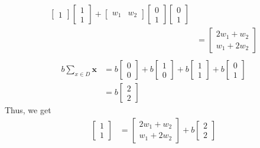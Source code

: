 \begin{align}
\begin{bmatrix}
    1
  \end{bmatrix} \begin{bmatrix}
    1 \\
    1
  \end{bmatrix} + \begin{bmatrix}
    w_1 & w_2
  \end{bmatrix} \begin{bmatrix}
    0 \\
    1
  \end{bmatrix} \begin{bmatrix}
    0 \\
    1
  \end{bmatrix} \\
  &= \begin{bmatrix}
    2w_1 + w_2 \\
    w_1 + 2w_2
  \end{bmatrix} \\
  \nonumber
\end{align}
\begin{align}
  b\sum_{x\in D}\textbf{x} &= 
    b\begin{bmatrix}
      0 \\
      0
    \end{bmatrix} + b\begin{bmatrix}
      1 \\
      0
    \end{bmatrix} + b\begin{bmatrix}
      1 \\
      1
    \end{bmatrix} + b\begin{bmatrix}
      0 \\
      1
    \end{bmatrix}\\
  &= b\begin{bmatrix}
    2 \\
    2
  \end{bmatrix}
\end{align}
Thus, we get
\begin{align}
  \label{eq:second_set_normal_eq}
\begin{bmatrix}
  1 \\
  1
\end{bmatrix}  &= \begin{bmatrix}
  2w_1 + w_2 \\
  w_1 + 2w_2
\end{bmatrix} + b\begin{bmatrix}
  2 \\
  2
\end{bmatrix}
\end{align}
